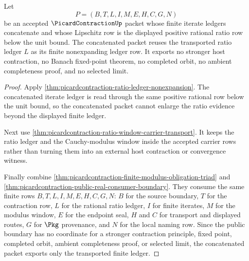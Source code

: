\begin{theorem}
\label{thm:picardcontraction-lean-ratio-ledger-nonexpansion-sync}
Let
$$
P=(B,T,L,I,M,E,H,C,G,N)
$$
be an accepted $\PicardContractionUp$ packet whose finite iterate ledgers concatenate and whose Lipschitz row is the displayed positive rational ratio row below the unit bound. The concatenated packet reuses the transported ratio ledger $L$ as its finite nonexpanding ledger row. It exports no stronger host contraction, no Banach fixed-point theorem, no completed orbit, no ambient completeness proof, and no selected limit.
\end{theorem}
\begin{proof}
Apply \autoref{thm:picardcontraction-ratio-ledger-nonexpansion}. The concatenated iterate ledger is read through the same positive rational row below the unit bound, so the concatenated packet cannot enlarge the ratio evidence beyond the displayed finite ledger.

Next use \autoref{thm:picardcontraction-ratio-window-carrier-transport}. It keeps the ratio ledger and the Cauchy-modulus window inside the accepted carrier rows rather than turning them into an external host contraction or convergence witness.

Finally combine \autoref{thm:picardcontraction-finite-modulus-obligation-triad} and \autoref{thm:picardcontraction-public-real-consumer-boundary}. They consume the same finite rows $B,T,L,I,M,E,H,C,G,N$: $B$ for the source boundary, $T$ for the contraction row, $L$ for the rational ratio ledger, $I$ for finite iterates, $M$ for the modulus window, $E$ for the endpoint seal, $H$ and $C$ for transport and displayed routes, $G$ for $\Pkg$ provenance, and $N$ for the local naming row. Since the public boundary has no coordinate for a stronger contraction principle, fixed point, completed orbit, ambient completeness proof, or selected limit, the concatenated packet exports only the transported finite ledger.
\end{proof}

